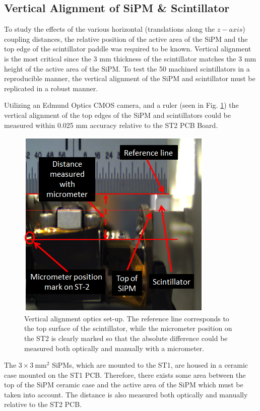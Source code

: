 \subsection{Vertical Alignment of SiPM \& Scintillator}
\label{sec:vertical alignment of SiPM and Scintillator}

To study the effects of the various horizontal (translations along the $z-axis$) coupling distances, the relative position of the active area of the SiPM and the top edge of the scintillator paddle was required to be known.  Vertical alignment is the most critical since the 3 mm thickness of the scintillator matches the 3 mm height of the active area of the SiPM.  To test the 50 machined scintillators in a reproducible manner, the vertical alignment of the SiPM and scintillator must be replicated in a robust manner.

Utilizing an Edmund Optics CMOS camera, and a ruler (seen in Fig. \ref{fig:sipm_va_optics}) the vertical alignment of the top edges of the SiPM and scintillators could be measured within 0.025 mm accuracy relative to the ST2 PCB Board.
\begin{figure}[!htb]
	\centering
	\includegraphics[width=1.0\columnwidth]{misalignment/figs/sipm_va_optics}
	\caption{Vertical alignment optics set-up.  The reference line corresponds to the top surface of the scintillator, while the micrometer position on the ST2 is clearly marked so that the absolute difference could be measured both optically and manually with a micrometer.}
	\label{fig:sipm_va_optics}
\end{figure}
The $3 \times 3\ \mathrm{mm^{2}}$ SiPMs, which are mounted to the ST1, are housed in a ceramic case mounted on the ST1 PCB.  Therefore, there exists some area between the top of the SiPM ceramic case and the active area of the SiPM which must be taken into account.  The distance is also measured both optically and manually relative to the ST2 PCB.

